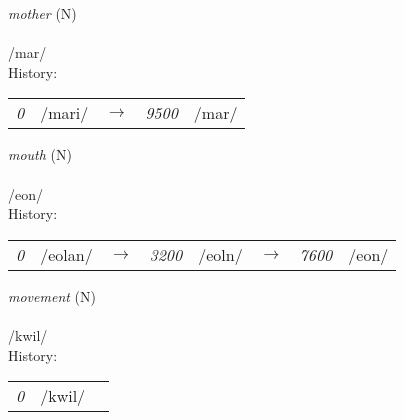 \vspace{15pt}
\begin{nopagebreak}
 \textit{mother} (N)\\
\\
\noindent /m{\textprimstress}ar/\\


\noindent History:

\vspace{-0pt}
\hspace{40pt}
\begin{tabular}{ccc}
\textit{0} & /mari/&$\rightarrow$ & \textit{9500} & /mar/& \\
\end{tabular}

\vspace{20pt}\hline

\end{nopagebreak}
\filbreak



\vspace{15pt}
\begin{nopagebreak}
 \textit{mouth} (N)\\
\\
\noindent /{\textprimstress}eon/\\


\noindent History:

\vspace{-0pt}
\hspace{40pt}
\begin{tabular}{ccc}
\textit{0} & /eolan/&$\rightarrow$ & \textit{3200} & /eoln/&$\rightarrow$ & \textit{7600} & /eon/& \\
\end{tabular}

\vspace{20pt}\hline

\end{nopagebreak}
\filbreak



\vspace{15pt}
\begin{nopagebreak}
 \textit{movement} (N)\\
\\
\noindent /kw{\textprimstress}il/\\


\noindent History:

\vspace{-0pt}
\hspace{40pt}
\begin{tabular}{ccc}
\textit{0} & /kwil/& \\
\end{tabular}

\vspace{20pt}\hline

\end{nopagebreak}
\filbreak



